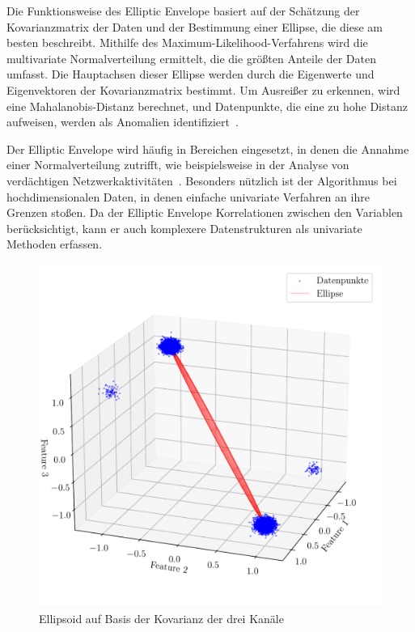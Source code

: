 Die Funktionsweise des Elliptic Envelope basiert auf der Schätzung der Kovarianzmatrix der Daten und der Bestimmung einer Ellipse, die diese am besten
beschreibt. Mithilfe des Maximum-Likelihood-Verfahrens wird die multivariate Normalverteilung ermittelt, die die größten Anteile der Daten umfasst. Die
Hauptachsen dieser Ellipse werden durch die Eigenwerte und Eigenvektoren der Kovarianzmatrix bestimmt. Um Ausreißer zu erkennen, wird eine
Mahalanobis-Distanz berechnet, und Datenpunkte, die eine zu hohe Distanz aufweisen, werden als Anomalien identifiziert~\cite{Ashrafuzzaman2020}.

Der Elliptic Envelope wird häufig in Bereichen eingesetzt, in denen die Annahme einer Normalverteilung zutrifft, wie beispielsweise in der Analyse von
verdächtigen Netzwerkaktivitäten~\cite{Ashrafuzzaman2020}. Besonders nützlich ist der Algorithmus bei hochdimensionalen Daten, in denen
einfache univariate Verfahren an ihre Grenzen stoßen. Da der Elliptic Envelope Korrelationen zwischen den Variablen berücksichtigt, kann er auch
komplexere Datenstrukturen als univariate Methoden erfassen.

\begin{figure}[t!]
    \centering
        \includegraphics[width=1\linewidth]{ch4_anomalien/abbildungen/EE_ellipse.pdf}
    \caption{Ellipsoid auf Basis der Kovarianz der drei Kanäle}
    \label{fig:ee_ellipse}
\end{figure}

